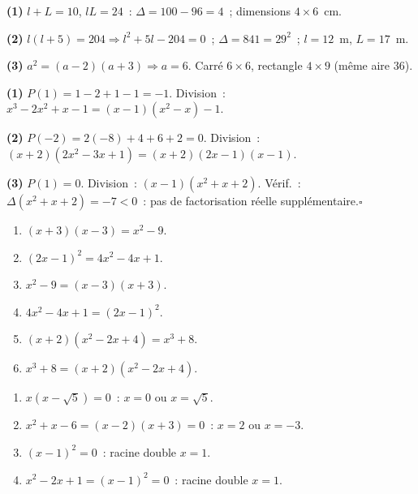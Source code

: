 
\textbf{(1)} $l+L=10$, $lL=24$~: $\Delta=100-96=4$~; dimensions $4\times6$~cm.

\textbf{(2)} $l(l+5)=204\Rightarrow l^2+5l-204=0$~; $\Delta=841=29^2$~;
$l=12$~m, $L=17$~m.

\textbf{(3)} $a^2=(a-2)(a+3)\Rightarrow a=6$.
Carr\'e $6\times6$, rectangle $4\times9$ (m\^eme aire $36$).\checkmark


\textbf{(1)} $P(1)=1-2+1-1=-1$. Division~: $x^3-2x^2+x-1=(x-1)(x^2-x)-1$.

\textbf{(2)} $P(-2)=2(-8)+4+6+2=0$. Division~: $(x+2)(2x^2-3x+1)=(x+2)(2x-1)(x-1)$.

\textbf{(3)} $P(1)=0$. Division~: $(x-1)(x^2+x+2)$.
V\'erif.~: $\Delta(x^2+x+2)=-7<0$~: pas de factorisation r\'eelle suppl\'ementaire.\hfill$\square$


\begin{enumerate}
  \item $(x+3)(x-3)=x^2-9$.
  \item $(2x-1)^2=4x^2-4x+1$.
  \item $x^2-9=(x-3)(x+3)$.
  \item $4x^2-4x+1=(2x-1)^2$.
  \item $(x+2)(x^2-2x+4)=x^3+8$.
  \item $x^3+8=(x+2)(x^2-2x+4)$.
\end{enumerate}


\begin{enumerate}
  \item $x(x-\sqrt{5})=0$~: $x=0$ ou $x=\sqrt{5}$.
  \item $x^2+x-6=(x-2)(x+3)=0$~: $x=2$ ou $x=-3$.
  \item $(x-1)^2=0$~: racine double $x=1$.
  \item $x^2-2x+1=(x-1)^2=0$~: racine double $x=1$.
\end{enumerate}


